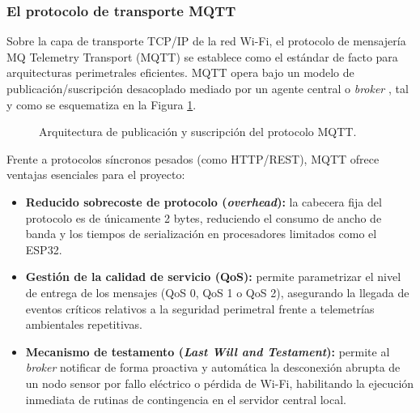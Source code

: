 \subsubsection{El protocolo de transporte MQTT}
Sobre la capa de transporte TCP/IP de la red Wi-Fi, el protocolo de mensajería MQ Telemetry Transport (MQTT) se establece como el estándar de facto para arquitecturas perimetrales eficientes. MQTT opera bajo un modelo de publicación/suscripción desacoplado mediado por un agente central o \textit{broker} \cite{al2015internet}, tal y como se esquematiza en la Figura \ref{fig:mqtt_pubsub}.

\begin{figure}[H]
    \centering
    \caption{Arquitectura de publicación y suscripción del protocolo MQTT.}
    \label{fig:mqtt_pubsub}
\end{figure}

Frente a protocolos síncronos pesados (como HTTP\slash REST), MQTT ofrece ventajas esenciales para el proyecto:
\begin{itemize}
    \item \textbf{Reducido sobrecoste de protocolo (\textit{overhead}):} la cabecera fija del protocolo es de únicamente 2 bytes, reduciendo el consumo de ancho de banda y los tiempos de serialización en procesadores limitados como el ESP32.
    \item \textbf{Gestión de la calidad de servicio (QoS):} permite parametrizar el nivel de entrega de los mensajes (QoS 0, QoS 1 o QoS 2), asegurando la llegada de eventos críticos relativos a la seguridad perimetral frente a telemetrías ambientales repetitivas.
    \item \textbf{Mecanismo de testamento (\textit{Last Will and Testament}):} permite al \textit{broker} notificar de forma proactiva y automática la desconexión abrupta de un nodo sensor por fallo eléctrico o pérdida de Wi-Fi, habilitando la ejecución inmediata de rutinas de contingencia en el servidor central local.
\end{itemize}

